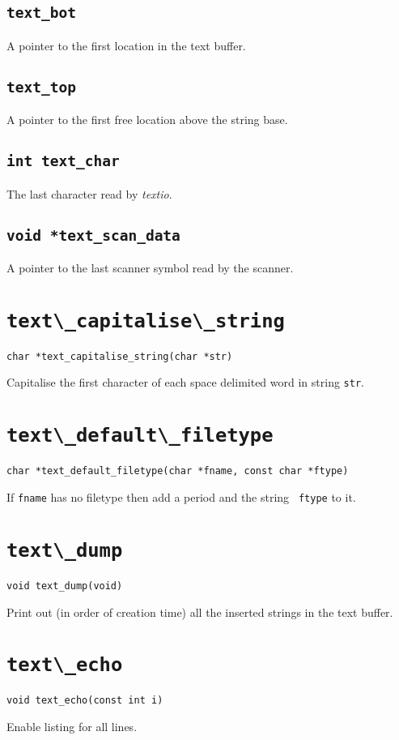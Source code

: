 \subsection{\tt *text\_bot}
A pointer to the first location in the text buffer.
\subsection{\tt *text\_top}
A pointer to the first free location above the string base.
\subsection{\tt int text\_char}
The last character read by {\em textio}.
\subsection{\tt void *text\_scan\_data}
A pointer to the last scanner symbol read by the scanner.

\section{\protect\verb+text\_capitalise\_string+}
\begin{verbatim}
char *text_capitalise_string(char *str)
\end{verbatim}
Capitalise the first character of each space delimited word in string {\tt str}.

\section{\protect\verb+text\_default\_filetype+}
\begin{verbatim}
char *text_default_filetype(char *fname, const char *ftype)
\end{verbatim}
If {\tt fname} has no filetype then add a period and the string {\tt
ftype} to it.

\section{\protect\verb+text\_dump+}
\begin{verbatim}
void text_dump(void)
\end{verbatim}
Print out (in order of creation time) all the inserted strings in the text buffer.

\section{\protect\verb+text\_echo+}
\begin{verbatim}
void text_echo(const int i)
\end{verbatim}
Enable listing for all lines.


